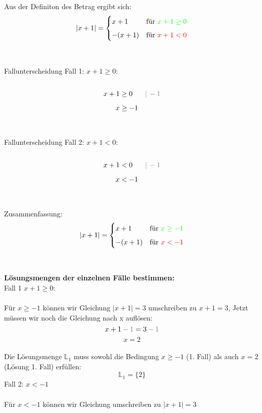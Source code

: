 \documentclass[10pt,landscape]{article}
\begin{document}
\begin{multicols}{3}
    Aus der Definiton des Betrag ergibt sich: \\
    \begin{equation*} |x + 1| = \begin{cases} x + 1 &\text{für } {\color{green}x + 1 \geq 0} \\[5px] -(x + 1) &\text{für } {\color{red}x + 1 < 0} \end{cases} \end{equation*}\\~\\
    Fallunterscheidung Fall 1: $x + 1\geq 0$:\\~\\
    \begin{align*} x + 1 &\geq 0 &&{\color{gray}|\, -1} \\[5px] x &\geq -1 \end{align*}\\~\\
    Fallunterscheidung Fall 2: $x + 1 < 0$:\\~\\
    \begin{align*} x + 1 &< 0 &&{\color{gray}|\, -1} \\[5px] x &< -1 \end{align*}\\~\\
    Zusammenfassung:
    \begin{equation*} |x + 1| = \begin{cases} x + 1 &\text{für } {\color{green}x \geq -1} \\[5px] -(x + 1) &\text{für } {\color{red}x < -1} \end{cases} \end{equation*}\\~\\
    \textbf{Lösungsmengen der einzelnen Fälle bestimmen:} \\
    Fall 1 $x + 1\geq 0$:\\~\\
    Für $x \geq -1$ können wir Gleichung $|x + 1| = 3$ umschreiben zu $x + 1 = 3$, Jetzt müssen wir noch die Gleichung nach x auflösen:
    \[x + 1 {\color{gray}\:-\:1} = 3 {\color{gray}\:-\:1}\]
    \[x = 2\] \\
    Die Lösungsmenge $\mathbb{L}_1$ muss sowohl die Bedingung $x \geq -1$ (1. Fall) als auch $x = 2$ (Lösung 1. Fall) erfüllen:
    \[\mathbb{L}_1 = \{2\}\]
    Fall 2: $x < -1$ \\~\\
    Für  $x < -1$ können wir Gleichung umschreiben zu $|x + 1| = 3$ \\

\end{multicols}
\end{document}
